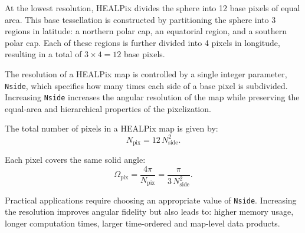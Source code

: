 At the lowest resolution, HEALPix divides the sphere into 12 base pixels of equal area. This base tessellation is constructed by partitioning the sphere into 3 regions in latitude: a northern polar cap, an equatorial region, and a southern polar cap. Each of these regions is further divided into 4 pixels in longitude, resulting in a total of $3 \times 4 = 12$ base pixels.

The resolution of a HEALPix map is controlled by a single integer parameter, \texttt{Nside}, which specifies how many times each side of a base pixel is subdivided. Increasing \texttt{Nside} increases the angular resolution of the map while preserving the equal-area and hierarchical properties of the pixelization.

The total number of pixels in a HEALPix map is given by:
\begin{equation}
N_{\text{pix}} = 12\,N_{\text{side}}^{2}.
\end{equation}

Each pixel covers the same solid angle:
\begin{equation}
\Omega_{\text{pix}} = \frac{4\pi}{N_{\text{pix}}} = \frac{\pi}{3\,N_{\text{side}}^{2}}.
\end{equation}

Practical applications require choosing an appropriate value of \texttt{Nside}. Increasing the resolution improves angular fidelity but also leads to: higher memory usage, longer computation times, larger time-ordered and map-level data products.
